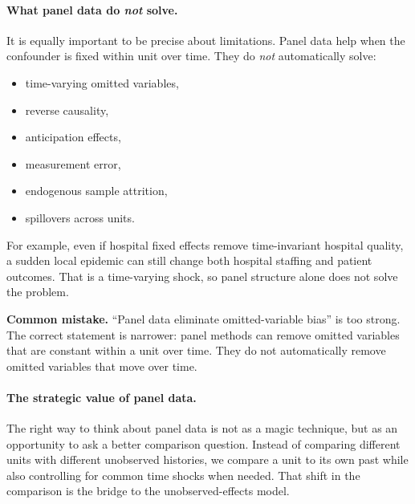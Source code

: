 \paragraph{What panel data do \emph{not} solve.}
It is equally important to be precise about limitations. Panel data help when the confounder is fixed within unit over time. They do \emph{not} automatically solve:
\begin{itemize}
\item time-varying omitted variables,
\item reverse causality,
\item anticipation effects,
\item measurement error,
\item endogenous sample attrition,
\item spillovers across units.
\end{itemize}

For example, even if hospital fixed effects remove time-invariant hospital quality, a sudden local epidemic can still change both hospital staffing and patient outcomes. That is a time-varying shock, so panel structure alone does not solve the problem.

\begin{boxF}
\textbf{Common mistake.}
``Panel data eliminate omitted-variable bias'' is too strong. The correct statement is narrower: panel methods can remove omitted variables that are constant within a unit over time. They do not automatically remove omitted variables that move over time.
\end{boxF}

\paragraph{The strategic value of panel data.}
The right way to think about panel data is not as a magic technique, but as an opportunity to ask a better comparison question. Instead of comparing different units with different unobserved histories, we compare a unit to its own past while also controlling for common time shocks when needed. That shift in the comparison is the bridge to the unobserved-effects model.

